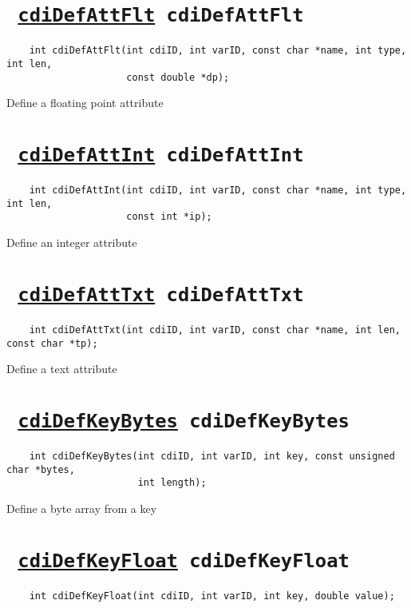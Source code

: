 

\section*{\texttt{ 
\ifpdf
\hyperref[cdiDefAttFlt]{cdiDefAttFlt}
\else
cdiDefAttFlt
\fi
}}
\begin{verbatim}
    int cdiDefAttFlt(int cdiID, int varID, const char *name, int type, int len, 
                     const double *dp);
\end{verbatim}

Define a floating point attribute
\ifpdfoutput{}{(\ref{cdiDefAttFlt})}


\section*{\texttt{ 
\ifpdf
\hyperref[cdiDefAttInt]{cdiDefAttInt}
\else
cdiDefAttInt
\fi
}}
\begin{verbatim}
    int cdiDefAttInt(int cdiID, int varID, const char *name, int type, int len, 
                     const int *ip);
\end{verbatim}

Define an integer attribute
\ifpdfoutput{}{(\ref{cdiDefAttInt})}


\section*{\texttt{ 
\ifpdf
\hyperref[cdiDefAttTxt]{cdiDefAttTxt}
\else
cdiDefAttTxt
\fi
}}
\begin{verbatim}
    int cdiDefAttTxt(int cdiID, int varID, const char *name, int len, const char *tp);
\end{verbatim}

Define a text attribute
\ifpdfoutput{}{(\ref{cdiDefAttTxt})}


\section*{\texttt{ 
\ifpdf
\hyperref[cdiDefKeyBytes]{cdiDefKeyBytes}
\else
cdiDefKeyBytes
\fi
}}
\begin{verbatim}
    int cdiDefKeyBytes(int cdiID, int varID, int key, const unsigned char *bytes, 
                       int length);
\end{verbatim}

Define a byte array from a key
\ifpdfoutput{}{(\ref{cdiDefKeyBytes})}


\section*{\texttt{ 
\ifpdf
\hyperref[cdiDefKeyFloat]{cdiDefKeyFloat}
\else
cdiDefKeyFloat
\fi
}}
\begin{verbatim}
    int cdiDefKeyFloat(int cdiID, int varID, int key, double value);
\end{verbatim}


